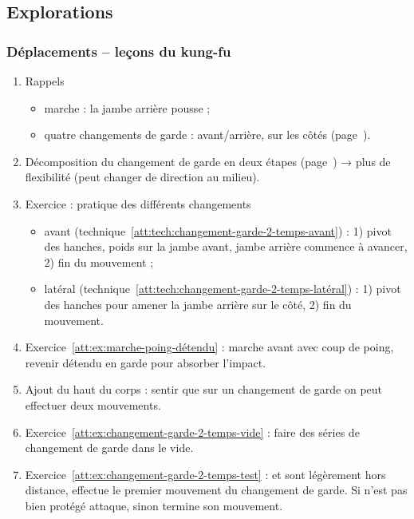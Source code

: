 \subsection{Explorations}


\subsubsection{Déplacements -- leçons du kung-fu}




\begin{enumerate}
	\item Rappels
	\begin{itemize}
		\item marche : la jambe arrière pousse ;
		\item quatre changements de garde : avant/arrière, sur les côtés (page~\pageref{dep:def:changement-garde-avant}).
	\end{itemize}
	
	\item Décomposition du changement de garde en deux étapes (page~\pageref{def:texte:garde-kung-fu}) → plus de flexibilité (peut changer de direction au milieu).
	
	\item Exercice : pratique des différents changements
	\begin{itemize}
		\item avant (technique~\ref{att:tech:changement-garde-2-temps-avant}) : 1) pivot des hanches, poids sur la jambe avant, jambe arrière commence à avancer, 2) fin du mouvement ;
		\item latéral (technique~\ref{att:tech:changement-garde-2-temps-latéral}) : 1) pivot des hanches pour amener la jambe arrière sur le côté, 2) fin du mouvement.
	\end{itemize}
	
	\item Exercice~\ref{att:ex:marche-poing-détendu} : marche avant avec coup de poing, revenir détendu en garde pour absorber l'impact.
	
	\item Ajout du haut du corps : sentir que sur un changement de garde on peut effectuer deux mouvements.
	
	\item Exercice~\ref{att:ex:changement-garde-2-temps-vide} : faire des séries de changement de garde dans le vide.
	
	\item Exercice~\ref{att:ex:changement-garde-2-temps-test} : \A et \D sont légèrement hors distance, \A effectue le premier mouvement du changement de garde.
	Si \A n'est pas bien protégé \D attaque, sinon \A termine son mouvement.
	

\end{enumerate}
